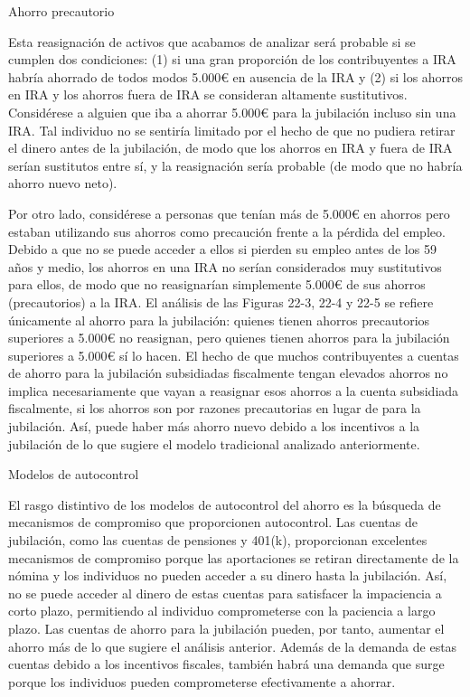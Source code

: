 \documentclass[10pt,a4paper]{article}
\begin{document}
Ahorro precautorio

Esta reasignación de activos que acabamos de analizar será probable si se cumplen dos condiciones: (1) si una gran proporción de los contribuyentes a IRA habría ahorrado de todos modos 5.000€ en ausencia de la IRA y (2) si los ahorros en IRA y los ahorros fuera de IRA se consideran altamente sustitutivos. Considérese a alguien que iba a ahorrar 5.000€ para la jubilación incluso sin una IRA. Tal individuo no se sentiría limitado por el hecho de que no pudiera retirar el dinero antes de la jubilación, de modo que los ahorros en IRA y fuera de IRA serían sustitutos entre sí, y la reasignación sería probable (de modo que no habría ahorro nuevo neto).

Por otro lado, considérese a personas que tenían más de 5.000€ en ahorros pero estaban utilizando sus ahorros como precaución frente a la pérdida del empleo. Debido a que no se puede acceder a ellos si pierden su empleo antes de los 59 años y medio, los ahorros en una IRA no serían considerados muy sustitutivos para ellos, de modo que no reasignarían simplemente 5.000€ de sus ahorros (precautorios) a la IRA. El análisis de las Figuras 22-3, 22-4 y 22-5 se refiere únicamente al ahorro para la jubilación: quienes tienen ahorros precautorios superiores a 5.000€ no reasignan, pero quienes tienen ahorros para la jubilación superiores a 5.000€ sí lo hacen. El hecho de que muchos contribuyentes a cuentas de ahorro para la jubilación subsidiadas fiscalmente tengan elevados ahorros no implica necesariamente que vayan a reasignar esos ahorros a la cuenta subsidiada fiscalmente, si los ahorros son por razones precautorias en lugar de para la jubilación. Así, puede haber más ahorro nuevo debido a los incentivos a la jubilación de lo que sugiere el modelo tradicional analizado anteriormente.

Modelos de autocontrol

El rasgo distintivo de los modelos de autocontrol del ahorro es la búsqueda de mecanismos de compromiso que proporcionen autocontrol. Las cuentas de jubilación, como las cuentas de pensiones y 401(k), proporcionan excelentes mecanismos de compromiso porque las aportaciones se retiran directamente de la nómina y los individuos no pueden acceder a su dinero hasta la jubilación. Así, no se puede acceder al dinero de estas cuentas para satisfacer la impaciencia a corto plazo, permitiendo al individuo comprometerse con la paciencia a largo plazo. Las cuentas de ahorro para la jubilación pueden, por tanto, aumentar el ahorro más de lo que sugiere el análisis anterior. Además de la demanda de estas cuentas debido a los incentivos fiscales, también habrá una demanda que surge porque los individuos pueden comprometerse efectivamente a ahorrar.
\end{document}

